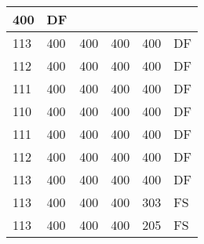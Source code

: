 \begin{table}[]
\begin{tabular}{lllll|l|}
400                                & DF                                    \\ \hline
113                                 & 400                                & 400                                & 400                                & 
400                                & DF                                    \\ \hline
112                                 & 400                                & 400                                & 400                                & 
400                                & DF                                    \\ \hline
111                                 & 400                                & 400                                & 400                                & 
400                                & DF                                    \\ \hline
110                                 & 400                                & 400                                & 400                                & 
400                                & DF                                    \\ \hline
111                                 & 400                                & 400                                & 400                                & 
400                                & DF                                    \\ \hline
112                                 & 400                                & 400                                & 400                                & 
400                                & DF                                    \\ \hline
113                                 & 400                                & 400                                & 400                                & 
400                                & DF                                    \\ \hline
113                                 & 400                                & 400                                & 400                                & 
303                                & FS                                    \\ \hline
113                                 & 400                                & 400                                & 400                                & 
205                                & FS                                    \\ \hline

\end{tabular}
\end{table}
